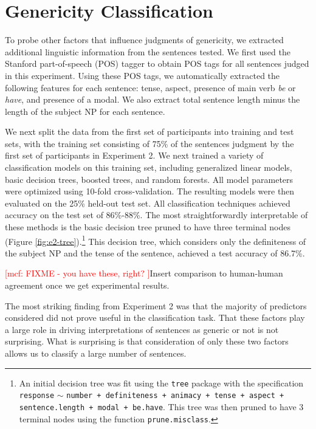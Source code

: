\documentclass[10pt,letterpaper]{article}
\newcommand{\mcf}[1]{\textcolor{Red}{[mcf: #1]}}
\begin{document}
\section{Genericity Classification}
To probe other factors that influence judgments of genericity, we extracted additional linguistic information from the sentences tested. We first used the Stanford part-of-speech (POS) tagger \cite{Toutanova:2003} to obtain POS tags for all sentences judged in this experiment. Using these POS tags, we automatically extracted the following features for each sentence: tense, aspect, presence of main verb \textit{be} or \textit{have}, and presence of a modal. We also extract total sentence length minus the length of the subject NP for each sentence.

We next split the data from the first set of participants into training and test sets, with the training set consisting of 75\% of the sentences judgment by the first set of participants in Experiment 2. We next trained a variety of classification models on this training set, including generalized linear models, basic decision trees, boosted trees, and random forests. All model parameters were optimized using 10-fold cross-validation. The resulting models were then evaluated on the 25\% held-out test set. All classification techniques achieved accuracy on the test set of 86\%-88\%. The most straightforwardly interpretable of these methods is the basic decision tree pruned to have three terminal nodes (Figure \ref{fig:e2-tree}).\footnote{An initial decision tree was fit using the \texttt{tree} package with the specification \texttt{response} \(\sim\) \texttt{number + definiteness + animacy + tense + aspect + sentence.length + modal + be.have}. This tree was then pruned to have 3 terminal nodes using the function \texttt{prune.misclass}.}  This decision tree, which considers only the definiteness of the subject NP and the tense of the sentence,  achieved a test accuracy of 86.7\%.

\mcf{FIXME - you have these, right?
}Insert comparison to human-human agreement once we get experimental results.

The most striking finding from Experiment 2 was that the majority of predictors considered did not prove useful in the classification task. That these factors play a large role in driving interpretations of sentences as generic or not is not surprising. What is surprising is that consideration of only these two factors allows us to classify a large number of sentences.
\end{document}
